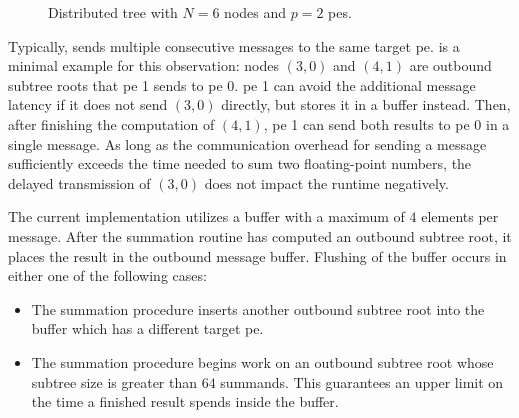 \begin{figure}
\centering
{}
\caption{Distributed tree with $N=6$ nodes and $p=2$ \glspl{pe}.}
\label{fig:messageBufferingTree}
\end{figure}

Typically,  sends multiple consecutive messages to the same target \gls{pe}.
 is a minimal example for this observation: nodes $(3,0)$ and $(4,1)$ are outbound subtree roots that \gls{pe} 1 sends to \gls{pe} 0.
\gls{pe} 1 can avoid the additional message latency if it does not send $(3,0)$ directly, but stores it in a buffer instead.
Then, after finishing the computation of $(4,1)$, \gls{pe} 1 can send both results to \gls{pe} 0 in a single message.
As long as the communication overhead for sending a message sufficiently exceeds the time needed to sum two floating-point numbers, the delayed transmission of $(3,0)$ does not impact the runtime negatively.

The current implementation utilizes a buffer with a maximum of $4$ elements per message.
After the summation routine has computed an outbound subtree root, it places the result in the outbound message buffer.
Flushing of the buffer occurs in either one of the following cases: \begin{itemize} 
\item The summation procedure inserts another outbound subtree root into the buffer which has a different target \gls{pe}.
\item The summation procedure begins work on an outbound subtree root whose subtree size is greater than $64$ summands. This guarantees an upper limit on the time a finished result spends inside the buffer.
\end{itemize}


